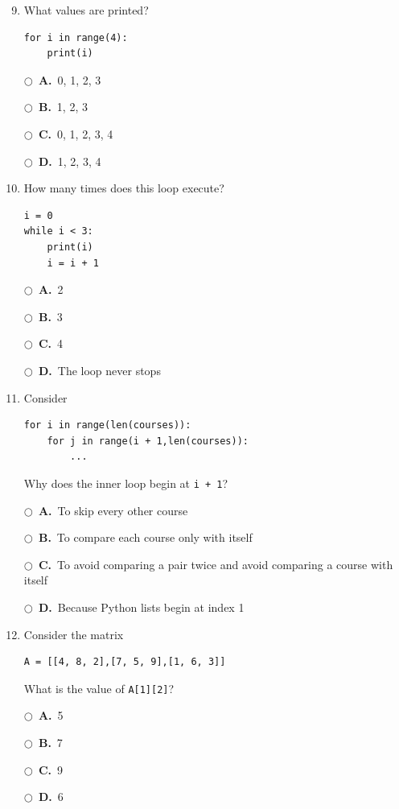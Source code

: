 \documentclass[11pt]{article}
\newcommand{\choice}[2]{%
    \par\noindent
    \(\bigcirc\)\ \textbf{#1.}\ #2
}
\begin{document}
\begin{enumerate}
\setcounter{enumi}{8}


\item What values are printed?

\begin{verbatim}
for i in range(4):
    print(i)
\end{verbatim}

\choice{A}{0, 1, 2, 3}
\choice{B}{1, 2, 3}
\choice{C}{0, 1, 2, 3, 4}
\choice{D}{1, 2, 3, 4}



\item How many times does this loop execute?

\begin{verbatim}
i = 0
while i < 3:
    print(i)
    i = i + 1
\end{verbatim}

\choice{A}{2}
\choice{B}{3}
\choice{C}{4}
\choice{D}{The loop never stops}



\item Consider

\begin{verbatim}
for i in range(len(courses)):
    for j in range(i + 1,len(courses)):
        ...
\end{verbatim}

Why does the inner loop begin at \texttt{i + 1}?

\choice{A}{To skip every other course}

\choice{B}{To compare each course only with itself}

\choice{C}{To avoid comparing a pair twice and avoid comparing a
course with itself}

\choice{D}{Because Python lists begin at index 1}



\item Consider the matrix

\begin{verbatim}
A = [[4, 8, 2],[7, 5, 9],[1, 6, 3]]
\end{verbatim}

What is the value of \texttt{A[1][2]}?

\choice{A}{5}
\choice{B}{7}
\choice{C}{9}
\choice{D}{6}

\end{enumerate}
\end{document}
